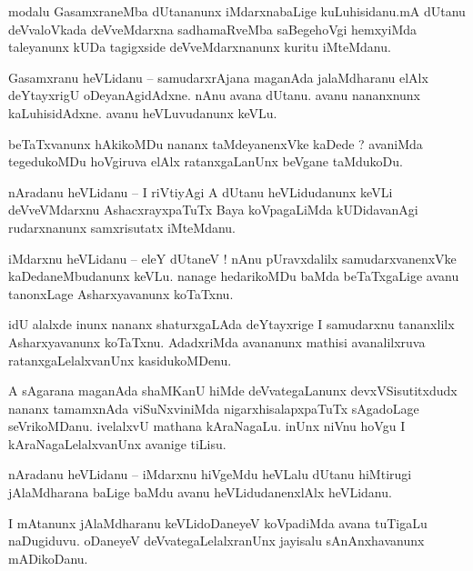 \documentclass{article}
\begin{document}
\begin{mn}%
modalu GasamxraneMba dUtananunx iMdarxnabaLige kuLuhisidanu.mA dUtanu deVvaloVkada deVveMdarxna 
sadhamaRveMba saBegehoVgi hemxyiMda taleyanunx kUDa tagigxside deVveMdarxnanunx kuritu iMteMdanu.
\end{mn}

\begin{mn}%
Gasamxranu heVLidanu -- samudarxrAjana maganAda jalaMdharanu elAlx deYtayxrigU oDeyanAgidAdxne. 
nAnu avana dUtanu. avanu nananxnunx kaLuhisidAdxne. avanu heVLuvudanunx keVLu.
\end{mn}

\begin{mn}%
beTaTxvanunx hAkikoMDu nananx taMdeyanenxVke kaDede ? avaniMda tegedukoMDu hoVgiruva elAlx 
ratanxgaLanUnx beVgane taMdukoDu.
\end{mn}

\begin{mn}%
nAradanu heVLidanu -- I riVtiyAgi A dUtanu heVLidudanunx keVLi deVveVMdarxnu AshacxrayxpaTuTx Baya 
koVpagaLiMda kUDidavanAgi rudarxnanunx samxrisutatx iMteMdanu.
\end{mn}

\begin{mn}%
iMdarxnu heVLidanu -- eleY dUtaneV ! nAnu pUravxdalilx samudarxvanenxVke kaDedaneMbudanunx keVLu. 
nanage hedarikoMDu baMda beTaTxgaLige avanu tanonxLage Asharxyavanunx koTaTxnu.
\end{mn}

\begin{mn}%
idU alalxde inunx nananx shaturxgaLAda deYtayxrige I samudarxnu tananxlilx Asharxyavanunx koTaTxnu. 
AdadxriMda avananunx mathisi avanalilxruva ratanxgaLelalxvanUnx kasidukoMDenu.
\end{mn}

\begin{mn}%
A sAgarana maganAda shaMKanU hiMde deVvategaLanunx devxVSisutitxdudx nananx tamamxnAda 
viSuNxviniMda nigarxhisalapxpaTuTx sAgadoLage seVrikoMDanu. ivelalxvU mathana kAraNagaLu. inUnx 
niVnu hoVgu I kAraNagaLelalxvanUnx avanige tiLisu.
\end{mn}

\begin{mn}%
nAradanu heVLidanu -- iMdarxnu hiVgeMdu heVLalu dUtanu hiMtirugi jAlaMdharana baLige baMdu avanu 
heVLidudanenxlAlx heVLidanu.
\end{mn}

\begin{mn}%
I mAtanunx jAlaMdharanu keVLidoDaneyeV koVpadiMda avana tuTigaLu naDugiduvu. oDaneyeV 
deVvategaLelalxranUnx jayisalu sAnAnxhavanunx mADikoDanu.
\end{mn}
\end{document}

